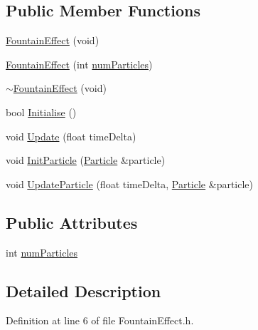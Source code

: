 \subsection*{Public Member Functions}
\begin{DoxyCompactItemize}
\item 
\hyperlink{class_b_g_e_1_1_fountain_effect_a5ae43701fa22342a6cf16addc3a591aa}{Fountain\-Effect} (void)
\item 
\hyperlink{class_b_g_e_1_1_fountain_effect_a81276261d25535f70afcf2f47185f396}{Fountain\-Effect} (int \hyperlink{class_b_g_e_1_1_fountain_effect_ad14aeae2eb1c334f432a1baeb447ad6b}{num\-Particles})
\item 
\hyperlink{class_b_g_e_1_1_fountain_effect_ac886404228c34643c1b092bfb279fa1d}{$\sim$\-Fountain\-Effect} (void)
\item 
bool \hyperlink{class_b_g_e_1_1_fountain_effect_a151663e1f6db044102e997b67554dcde}{Initialise} ()
\item 
void \hyperlink{class_b_g_e_1_1_fountain_effect_a01d3646a0aa9de6d2036860dccaddf19}{Update} (float time\-Delta)
\item 
void \hyperlink{class_b_g_e_1_1_fountain_effect_a6c43b5c290f7dda91562731d66ad26f4}{Init\-Particle} (\hyperlink{class_particle}{Particle} \&particle)
\item 
void \hyperlink{class_b_g_e_1_1_fountain_effect_a7ea7f3f94da9f08132ffbbaa562fd811}{Update\-Particle} (float time\-Delta, \hyperlink{class_particle}{Particle} \&particle)
\end{DoxyCompactItemize}
\subsection*{Public Attributes}
\begin{DoxyCompactItemize}
\item 
int \hyperlink{class_b_g_e_1_1_fountain_effect_ad14aeae2eb1c334f432a1baeb447ad6b}{num\-Particles}
\end{DoxyCompactItemize}


\subsection{Detailed Description}


Definition at line 6 of file Fountain\-Effect.\-h.



